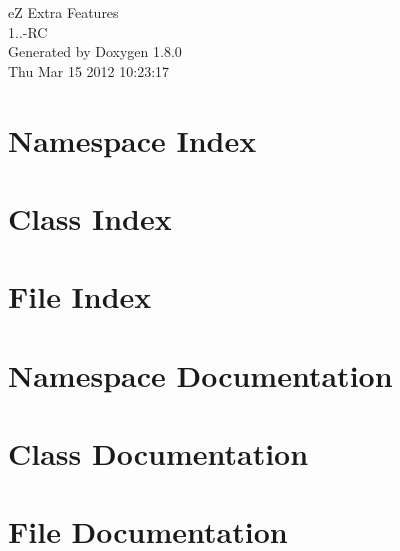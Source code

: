 \documentclass{book}
\begin{document}
\hypersetup{pageanchor=false,citecolor=blue}
\begin{titlepage}
\vspace*{7cm}
\begin{center}
{\Large e\-Z Extra Features \\[1ex]\large 1..-\/\-R\-C }\\
\vspace*{1cm}
{\large Generated by Doxygen 1.8.0}\\
\vspace*{0.5cm}
{\small Thu Mar 15 2012 10:23:17}\\
\end{center}
\end{titlepage}
\clearemptydoublepage
{}
\tableofcontents
\clearemptydoublepage
{}
\hypersetup{pageanchor=true,citecolor=blue}
\chapter{Namespace Index}

\chapter{Class Index}

\chapter{File Index}

\chapter{Namespace Documentation}



\chapter{Class Documentation}



\chapter{File Documentation}







\printindex
\end{document}
